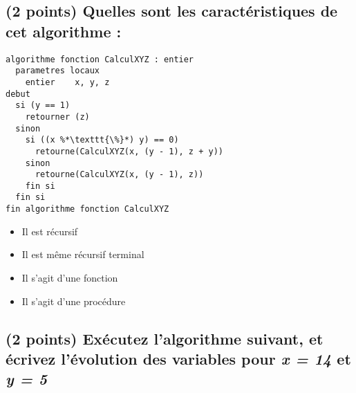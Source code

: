\documentclass[11pt,a4paper]{article}
\begin{document}


\subsection{(2 points) Quelles sont les caractéristiques de cet algorithme : }

\bigskip

\begin{lstlisting}[style=algorithmique]
algorithme fonction CalculXYZ : entier
  parametres locaux
    entier    x, y, z
debut
  si (y == 1)
    retourner (z)
  sinon
    si ((x %*\texttt{\%}*) y) == 0)
      retourne(CalculXYZ(x, (y - 1), z + y))
    sinon
      retourne(CalculXYZ(x, (y - 1), z))
    fin si
  fin si
fin algorithme fonction CalculXYZ \end{lstlisting}

\begin{itemize}
  \item[\CaseCoche] Il est récursif \\
  \item[\CaseCoche] Il est même récursif terminal \\
  \item[\CaseCoche] Il s'agit d'une fonction \\
  \item[\CaseCoche] Il s'agit d'une procédure \\
\end{itemize}


\newpage
\vfillFirst


\subsection{(2 points) Exécutez l'algorithme suivant, et écrivez l'évolution des variables pour \textit{x = 14} et \textit{y = 5} }

\end{document}
